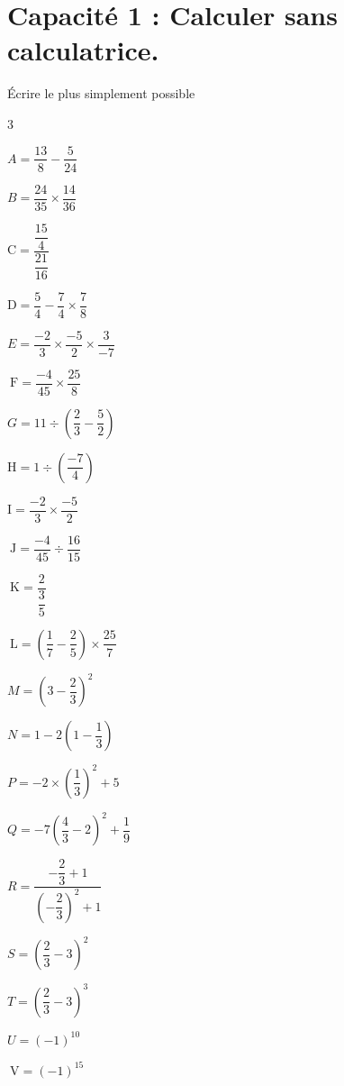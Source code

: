 \documentclass[10pt,a4paper]{article}  %
\begin{document}
\section*{Capacité 1 : Calculer sans calculatrice.}
\vspace*{-0.8cm}
\exerciceDS{}
Écrire le plus simplement possible\\
\begin{multicols}{3}
	\begin{enumMet}
	\item $A=\dfrac{13}{8}-\dfrac{5}{24}$
	\item $B=\dfrac{24}{35} \times \dfrac{14}{36}$
	\item $\mathrm{C}=\dfrac{\dfrac{15}{4}}{\dfrac{21}{16}}$
	\item $\mathrm{D}=\dfrac{5}{4}-\dfrac{7}{4} \times \dfrac{7}{8}$
	\item $E=\dfrac{-2}{3} \times \dfrac{-5}{2} \times \dfrac{3}{-7}$
	\item $\mathrm{~F}=\dfrac{-4}{45} \times \dfrac{25}{8}$
	\item $G=11 \div\left(\dfrac{2}{3}-\dfrac{5}{2}\right)$
	\item $\mathrm{H}=1 \div\left(\dfrac{-7}{4}\right)$
	\item $\mathrm{I}=\dfrac{-2}{3} \times \dfrac{-5}{2}$
	\item $\mathrm{~J}=\dfrac{-4}{45} \div \dfrac{16}{15}$
	\item $\mathrm{~K}=\dfrac{2}{\dfrac{3}{5}}$
	\item $\mathrm{~L}=\left(\dfrac{1}{7}-\dfrac{2}{5}\right) \times \dfrac{25}{7}$
	\item $M=\left(3-\dfrac{2}{3}\right)^{2}$
	\item $N=1-2\left(1-\dfrac{1}{3}\right)$
	\item $P=-2 \times\left(\dfrac{1}{3}\right)^{2}+5$
	\item $Q=-7\left(\dfrac{4}{3}-2\right)^{2}+\dfrac{1}{9}$
	\item $R=\dfrac{-\dfrac{2}{3}+1}{\left(-\dfrac{2}{3}\right)^{2}+1}$
	\item $S=\left(\dfrac{2}{3}-3\right)^{2}$
	\item $T=\left(\dfrac{2}{3}-3\right)^{3}$
	\item $U=(-1)^{10}$
	\item $\mathrm{~V}=(-1)^{15}$
\end{enumMet}
\end{multicols}
\vspace*{-0.8cm}
\exerciceDS{}
\end{document}
